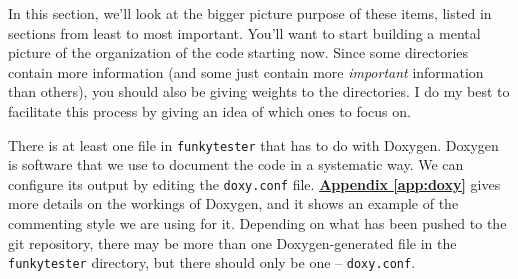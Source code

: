 \documentclass{report}
\begin{document}
In this section, we'll look at the bigger picture purpose of these items, listed in sections from least to most important. You'll want to start building a mental picture of the organization of the code starting now. Since some directories contain more information (and some just contain more \textit{important} information than others), you should also be giving weights to the directories. I do my best to facilitate this process by giving an idea of which ones to focus on.

There is at least one file in \texttt{funkytester} that has to do with Doxygen. Doxygen is software that we use to document the code in a systematic way. We can configure its output by editing the \texttt{doxy.conf} file. \hyperref[app:doxy]{\textbf{Appendix \ref{app:doxy}}} gives more details on the workings of Doxygen, and it shows an example of the commenting style we are using for it. Depending on what has been pushed to the git repository, there may be more than one Doxygen-generated file in the \texttt{funkytester} directory, but there should only be one -- \texttt{doxy.conf}.
\end{document}
